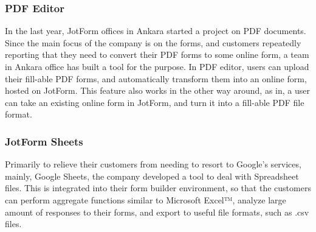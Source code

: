 \subsubsection{PDF Editor}
In the last year, JotForm offices in Ankara started a project on PDF documents. Since the main focus of the company is on the forms, and customers repeatedly reporting that they need to convert their PDF forms to some online form, a team in Ankara office has built a tool for the purpose. In PDF editor, users can upload their fill-able PDF forms, and automatically transform them into an online form, hosted on JotForm. This feature also works in the other way around, as in, a user can take an existing online form in JotForm, and turn it into a fill-able PDF file format.

\subsubsection{JotForm Sheets}
Primarily to relieve their customers from needing to resort to Google's services, mainly, Google Sheets, the company developed a tool to deal with Spreadsheet files.
This is integrated into their form builder environment, so that the customers can perform aggregate functions similar to Microsoft Excel™, analyze large amount of responses to their forms, and export to useful file formats, such as .csv files.\cite{TSAForecasting}